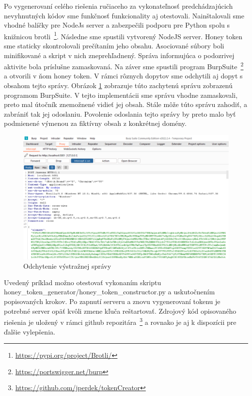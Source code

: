 \documentclass[conference, 11pt,slovak,a4paper,twoside]{IEEEtran}
\begin{document}
Po vygenerovaní celého riešenia ručiaceho za vykonateľnosť predchádzajúcich nevyhnutných kódov sme funkčnosť funkcionality aj otestovali. Nainštalovali sme vhodné balíčky pre NodeJs server a zabezpečili podporu pre Python spolu s knižnicou brotli~\footnote{\url{https://pypi.org/project/Brotli/}}. Následne sme spustili vytvorený NodeJS server. Honey token sme staticky skontrolovali prečítaním jeho obsahu. Asociované súbory boli minifikované a skript v nich zneprehľadnený. Správa informujúca o podozrivej aktivite bola príslušne zamaskovaná. Na záver sme spustili program BurpSuite~\footnote{\url{https://portswigger.net/burp}} a otvorili v ňom honey token. V rámci rôznych dopytov sme odchytili aj dopyt s obsahom tejto správy. Obrázok \ref{burpSuiteCapturing} zobrazuje túto zachytenú správu zobrazenú programom BurpSuite. V tejto implementácii sme správu vhodne zamaskovali, preto mal útočník znemožnené vidieť jej obsah. Stále môže túto správu zahodiť, a zabrániť tak jej odoslaniu. Povolenie odoslania tejto správy by preto malo byť podmienené výmenou za fiktívny obsah z konkrétnej domény. 

\begin{figure}[!t]  %
					\begin{center}
									\includegraphics[width=\linewidth]{fig/burpSuite.png}
									\caption{Odchytenie výstražnej správy}
									\label{burpSuiteCapturing}
					\end{center}
\end{figure}

Uvedený príklad možno otestovať vykonaním skriptu honey\_token\_generator/honey\_token\_constructor.py a uskutočnením popisovaných krokov. Po zapnutí serveru a znovu vygenerovaní tokenu je potrebné server opäť kvôli zmene kľuča reštartovať. Zdrojový kód opisovaného riešenia je uložený v rámci github repozitára~\footnote{\url{https://github.com/jperdek/tokenCreator}} a rovnako je aj k dispozícii pre ďalšie vylepšenia.
\end{document}
